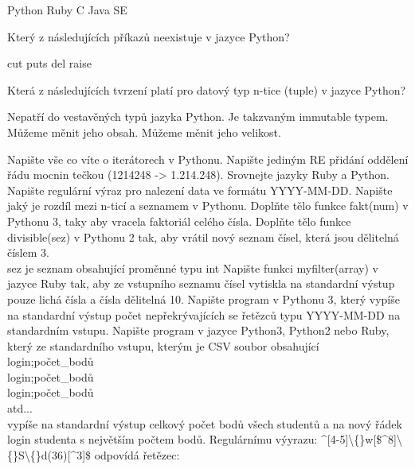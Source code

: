 \documentclass[addpoints,12pt]{exam}
\begin{document}
\begin{questions}
\begin{choices}
\choice
Python
\choice
Ruby
\choice
C
\choice
Java SE
\end{choices}
\question[2]
Který z následujících příkazů neexistuje v jazyce Python?
\nopagebreak
\begin{choices}
\choice
cut
\choice
puts
\choice
del
\choice
raise
\end{choices}
\question[2]
Která z následujících tvrzení platí pro datový typ n-tice (tuple) v jazyce Python?
\nopagebreak
\begin{choices}
\choice
Nepatří do vestavěných typů jazyka Python.
\choice
Je takzvaným immutable typem.
\choice
Můžeme měnit jeho obsah.
\choice
Můžeme měnit jeho velikost.
\end{choices}
\question[2]
Napište vše co víte o iterátorech v Pythonu.
\nopagebreak
\makeemptybox{10cm}
\question[2]
Napište jediným RE přidání oddělení řádu mocnin tečkou (1214248 -\textgreater{} 1.214.248).
\nopagebreak
\makeemptybox{10cm}
\question[2]
Srovnejte jazyky Ruby a Python.
\nopagebreak
\makeemptybox{10cm}
\question[2]
Napište regulární výraz pro nalezení data ve formátu YYYY-MM-DD.
\nopagebreak
\makeemptybox{10cm}
\question[2]
Napište jaký je rozdíl mezi n-ticí a seznamem v Pythonu.
\nopagebreak
\makeemptybox{10cm}
\question[2]
Doplňte tělo funkce fakt(num) v Pythonu 3, taky aby vracela faktoriál celého čísla.
\nopagebreak
\makeemptybox{10cm}
\question[2]
Doplňte tělo funkce divisible(sez) v Pythonu 2 tak, aby vrátil nový seznam čísel, která jsou dělitelná číslem 3.\\
sez je seznam obsahující proměnné typu int
\nopagebreak
\makeemptybox{10cm}
\question[2]
Napište funkci myfilter(array) v jazyce Ruby tak, aby ze vstupního seznamu čísel vytiskla na standardní výstup pouze lichá čísla a čísla dělitelná 10.
\nopagebreak
\makeemptybox{10cm}
\question[2]
Napište program v Pythonu 3, který vypíše na standardní výstup počet nepřekrývajících se řetězců typu YYYY-MM-DD na standardním vstupu.
\nopagebreak
\makeemptybox{10cm}
\question[2]
Napište program v jazyce Python3, Python2 nebo Ruby, který ze standardního vstupu, kterým je CSV soubor obsahující\\
login;počet\_{}bodů\\
login;počet\_{}bodů\\
login;počet\_{}bodů\\
atd...\\
vypíše na standardní výstup celkový počet bodů všech studentů a na nový řádek login studenta s největším počtem bodů.
\nopagebreak
\makeemptybox{10cm}
\question[2]
Regulárnímu výyrazu: \^{}[4-5]\textbackslash\{\}w[\${}\^{}8]\textbackslash\{\}S\textbackslash\{\}d(3\textbar{}6)[\^{}3]\${} odpovídá řetězec:

\end{questions}
\end{document}
